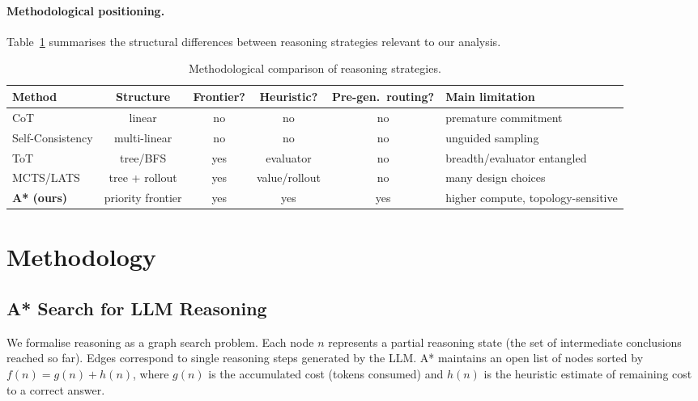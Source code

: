 \documentclass{article}
\begin{document}
\paragraph{Methodological positioning.}
Table~\ref{tab:method_comparison} summarises the structural differences between
reasoning strategies relevant to our analysis.

\begin{table}[t]
\centering
\caption{Methodological comparison of reasoning strategies.}
\label{tab:method_comparison}
\small
\setlength{\tabcolsep}{3.5pt}
\begin{tabular}{@{}lcccc p{2.8cm}@{}}
\toprule
\textbf{Method} & \textbf{Structure} & \textbf{Frontier?} & \textbf{Heuristic?}
  & \textbf{Pre-gen.\ routing?} & \textbf{Main limitation} \\
\midrule
CoT & linear & no & no & no & premature commitment \\
Self-Consistency & multi-linear & no & no & no & unguided sampling \\
ToT & tree/BFS & yes & evaluator & no & breadth/evaluator entangled \\
MCTS/LATS & tree + rollout & yes & value/rollout & no & many design choices \\
\textbf{A* (ours)} & priority frontier & yes & yes & yes & higher compute, topology-sensitive \\
\bottomrule
\end{tabular}
\end{table}

\section{Methodology}
\label{sec:method}

\subsection{A* Search for LLM Reasoning}
\label{sec:astar_method}

We formalise reasoning as a graph search problem.  Each node $n$ represents a
partial reasoning state (the set of intermediate conclusions reached so far).
Edges correspond to single reasoning steps generated by the LLM.  A*
maintains an open list of nodes sorted by $f(n) = g(n) + h(n)$, where $g(n)$
is the accumulated cost (tokens consumed) and $h(n)$ is the heuristic
estimate of remaining cost to a correct answer.
\end{document}

